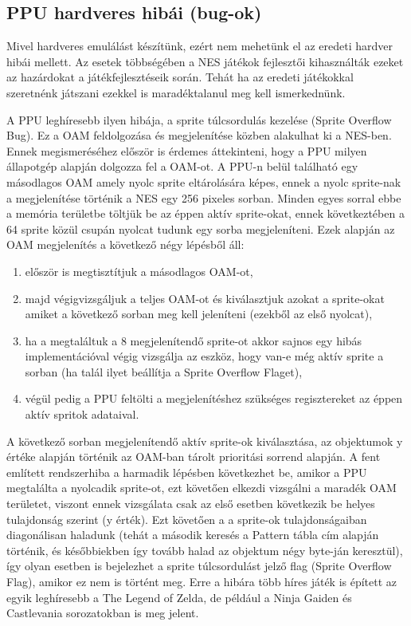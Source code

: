  	 \subsection{PPU hardveres hibái (bug-ok)}
 	 Mivel hardveres emulálást készítünk, ezért nem mehetünk el az eredeti hardver hibái mellett. Az esetek többségében a NES játékok fejlesztői kihasználták ezeket az hazárdokat a játékfejlesztéseik során. Tehát ha az eredeti játékokkal szeretnénk játszani ezekkel is maradéktalanul meg kell ismerkednünk.
 	 
 	 A PPU leghíresebb ilyen hibája, a sprite túlcsordulás kezelése (Sprite Overflow Bug). Ez a OAM feldolgozása és megjelenítése közben alakulhat ki a NES-ben. Ennek megismeréséhez először is érdemes áttekinteni, hogy a PPU milyen állapotgép alapján dolgozza fel a OAM-ot. A PPU-n belül található egy másodlagos OAM amely nyolc sprite eltárolására képes, ennek a nyolc sprite-nak a megjelenítése történik a NES egy 256 pixeles sorban. Minden egyes sorral ebbe a memória területbe töltjük be az éppen aktív sprite-okat, ennek következtében a 64 sprite közül csupán nyolcat tudunk egy sorba megjeleníteni. Ezek alapján az OAM megjelenítés a következő négy lépésből áll:
 	  
 	 \begin{enumerate}
 	 	\item először is megtisztítjuk a másodlagos OAM-ot,
 	 	\item majd végigvizsgáljuk a teljes OAM-ot és kiválasztjuk azokat a sprite-okat amiket a következő sorban meg kell jeleníteni (ezekből az első nyolcat),
 	 	\item ha a megtaláltuk a 8 megjelenítendő sprite-ot akkor sajnos egy hibás implementációval végig vizsgálja az eszköz, hogy van-e még aktív sprite a sorban (ha talál ilyet beállítja a Sprite Overflow Flaget),
 	 	\item végül pedig a PPU feltölti a megjelenítéshez szükséges regisztereket az éppen aktív spritok adataival.
 	 \end{enumerate}
 	 
 	 A következő sorban megjelenítendő aktív sprite-ok kiválasztása, az objektumok y értéke alapján történik az OAM-ban tárolt prioritási sorrend alapján. A fent említett rendszerhiba a harmadik lépésben következhet be, amikor a PPU megtalálta a nyolcadik sprite-ot, ezt követően elkezdi vizsgálni a maradék OAM területet, viszont ennek vizsgálata csak az első esetben következik be helyes tulajdonság szerint (y érték). Ezt követően a a sprite-ok tulajdonságaiban diagonálisan haladunk (tehát a második keresés a Pattern tábla cím alapján történik, és későbbiekben így tovább halad az objektum négy byte-ján keresztül), így olyan esetben is bejelezhet a sprite túlcsordulást jelző flag (Sprite Overflow Flag), amikor ez nem is történt meg. Erre a hibára több híres játék is épített az egyik leghíresebb a The Legend of Zelda, de például a Ninja Gaiden és Castlevania sorozatokban is meg jelent.
 	 
